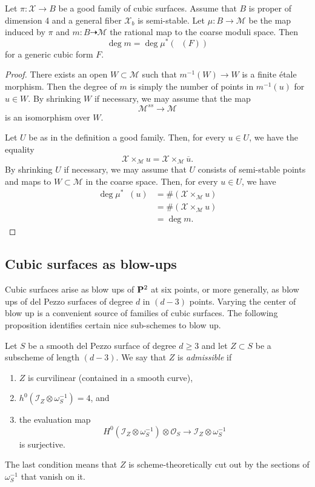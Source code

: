 \documentclass[12pt,reqno]{amsart}
\DeclareMathOperator{\Orb}{\overline{Orb}}
\renewcommand{\to}{{\longrightarrow}}
\numberwithin{equation}{section}
\renewcommand{\O}{\mathcal O}
\newcommand{\cX}{\mathcal{X}}
\begin{document}
\begin{proposition}\label{prop:goodisgood}
  Let $\pi \colon \cX \to B$ be a good family of cubic surfaces.
  Assume that $B$ is proper of dimension 4 and a general fiber $\cX_b$ is semi-stable.
  Let $\mu \colon B \to \mathscr M$ be the map induced by $\pi$ and $m \colon B \dashrightarrow \mathcal M$ the rational map to the coarse moduli space.
  Then
  \[ \deg m = \deg \mu^*\left( \Orb(F) \right)\]
  for a generic cubic form $F$.
\end{proposition}
\begin{proof}
  There exists an open $W \subset \mathcal M$ such that $m^{-1} (W) \to W$ is a finite \'etale morphism.
  Then the degree of $m$ is simply the number of points in $m^{-1}(u)$ for $u \in W$.
  By shrinking $W$ if necessary, we may assume that the map
  \[ \mathscr M^{ss} \to \mathcal M\]
  is an isomorphism over $W$.

  Let $U$ be as in the definition a good family.
  Then, for every $u \in U$, we have the equality
  \[ \cX \times_{\mathscr M} u = \cX \times_{\mathscr M} \overline u.\]
  By shrinking $U$ if necessary, we may assume that $U$ consists of semi-stable points and maps to $W \subset \mathcal M$ in the coarse space.
  Then, for every $u \in U$, we have
  \begin{align*}
    \deg \mu^* \Orb(u) &= \# \left(\cX \times_{\mathscr M} u \right)\\
                       &= \# \left(\cX \times_{\mathcal M} u\right) \\
                       &= \deg m.
  \end{align*}
\end{proof}

\subsection{Cubic surfaces as blow-ups}
Cubic surfaces arise as blow ups of $\P^2$ at six points, or more generally, as blow ups of del Pezzo surfaces of degree $d$ in $(d-3)$ points.
Varying the center of blow up is a convenient source of families of cubic surfaces.
The following proposition identifies certain nice sub-schemes to blow up.

\begin{definition}
  \label{def:admissible}
  Let $S$ be a smooth del Pezzo surface of degree $d \geq 3$ and let $Z \subset S$ be a subscheme of length $(d-3)$.
  We say that $Z$ is \emph{admissible} if 
  \begin{enumerate}
  \item $Z$ is curvilinear (contained in a smooth curve),
  \item $h^{0}\left(\mathcal{I}_Z \otimes \omega_S^{-1}\right) = 4$, and
  \item the evaluation map
    \[ H^0(\mathcal{I}_Z \otimes \omega_S^{-1}) \otimes \O_{S} \to \mathcal I_Z \otimes \omega_S^{-1}\]
    is surjective.
  \end{enumerate}
\end{definition}
The last condition means that $Z$ is scheme-theoretically cut out by the sections of $\omega_S^{-1}$ that vanish on it.
\end{document}
